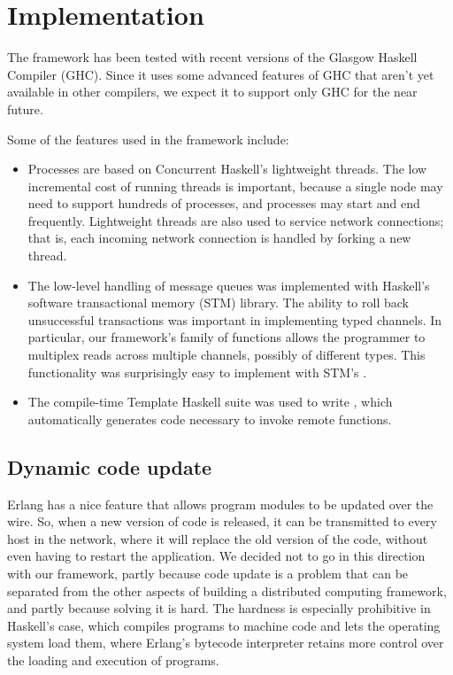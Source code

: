 \documentclass[preprint]{sigplanconf}
\begin{document}

\section{Implementation}
\label{s:Implementation}
The framework has been tested with recent versions of the Glasgow Haskell Compiler (GHC). Since it uses some advanced features of GHC that aren't yet available in other compilers, we expect it to support only GHC for the near future.

Some of the features used in the framework include:

\begin{itemize}
\item Processes are based on Concurrent Haskell's lightweight threads. The low incremental cost of running threads is important, because a single node may need to support hundreds of processes, and processes may start and end frequently. Lightweight threads are also used to service network connections; that is, each incoming network connection is handled by forking a new thread.
\item The low-level handling of message queues was implemented with Haskell's software transactional memory (STM) library. The ability to roll back unsuccessful transactions was important in implementing typed channels. In particular, our framework's  family of functions allows the programmer to multiplex reads across multiple channels, possibly of different types. This functionality was surprisingly easy to implement with STM's .
\item The compile-time Template Haskell suite was used to write , which automatically generates code necessary to invoke remote functions.
\end{itemize}

\subsection{Dynamic code update} \label{s:code-update}

Erlang has a nice feature that allows program modules to be updated over the wire. So, when a new version of code is released, it can be transmitted to every host in the network, where it will replace the old version of the code, without even having to restart the application. We decided not to go in this direction with our framework, partly because code update is a problem that can be separated from the other aspects of building a distributed computing framework, and partly because solving it is hard. The hardness is especially prohibitive in Haskell's case, which compiles programs to machine code and lets the operating system load them, where Erlang's bytecode interpreter retains more control over the loading and execution of programs.
\end{document}
